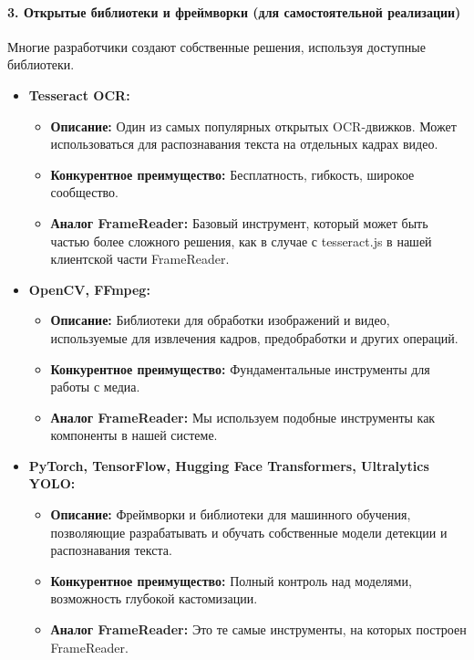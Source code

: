 \documentclass[12pt, a4paper]{article}
\theoremstyle{definition}
\theoremstyle{remark}
\begin{document}
	\paragraph{3. Открытые библиотеки и фреймворки (для самостоятельной реализации)}
	Многие разработчики создают собственные решения, используя доступные библиотеки.
	\begin{itemize}
		\item \textbf{Tesseract OCR:}
		\begin{itemize}
			\item \textbf{Описание:} Один из самых популярных открытых OCR-движков. Может использоваться для распознавания текста на отдельных кадрах видео.
			\item \textbf{Конкурентное преимущество:} Бесплатность, гибкость, широкое сообщество.
			\item \textbf{Аналог FrameReader:} Базовый инструмент, который может быть частью более сложного решения, как в случае с tesseract.js в нашей клиентской части FrameReader.
		\end{itemize}
		\item \textbf{OpenCV, FFmpeg:}
		\begin{itemize}
			\item \textbf{Описание:} Библиотеки для обработки изображений и видео, используемые для извлечения кадров, предобработки и других операций.
			\item \textbf{Конкурентное преимущество:} Фундаментальные инструменты для работы с медиа.
			\item \textbf{Аналог FrameReader:} Мы используем подобные инструменты как компоненты в нашей системе.
		\end{itemize}
		\item \textbf{PyTorch, TensorFlow, Hugging Face Transformers, Ultralytics YOLO:}
		\begin{itemize}
			\item \textbf{Описание:} Фреймворки и библиотеки для машинного обучения, позволяющие разрабатывать и обучать собственные модели детекции и распознавания текста.
			\item \textbf{Конкурентное преимущество:} Полный контроль над моделями, возможность глубокой кастомизации.
			\item \textbf{Аналог FrameReader:} Это те самые инструменты, на которых построен FrameReader.
		\end{itemize}
	\end{itemize}
	
\end{document}
